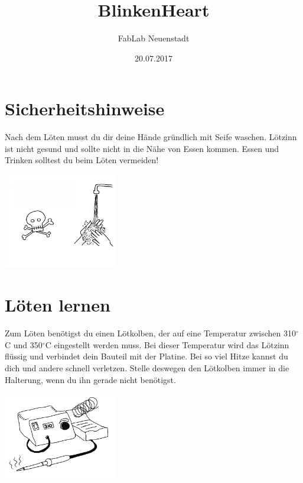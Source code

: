 \documentclass[a4paper,10pt]{article}
\title{BlinkenHeart}
\author{FabLab Neuenstadt}
\date{20.07.2017}
\begin{document}
\maketitle

\newpage
\section{Sicherheitshinweise}
Nach dem Löten musst du dir deine Hände gründlich mit Seife
waschen. Lötzinn ist nicht gesund und sollte nicht in die Nähe von
Essen kommen. Essen und Trinken solltest du beim Löten vermeiden!
\begin{center}
\includegraphics[width=5cm]{-000}
\end{center}

\section{Löten lernen}
Zum Löten benötigst du einen Lötkolben, der auf eine Temperatur
zwischen 310$^\circ$C und 350$^\circ$C eingestellt werden muss. Bei dieser
Temperatur wird das Lötzinn flüssig und verbindet dein Bauteil mit der
Platine. Bei so viel Hitze kannst du dich und andere schnell verletzen.
Stelle deswegen den Lötkolben immer in die Halterung, wenn du ihn
gerade nicht benötigst.
\begin{center}
	\includegraphics[width=5cm]{-002}
\end{center}
\end{document}
